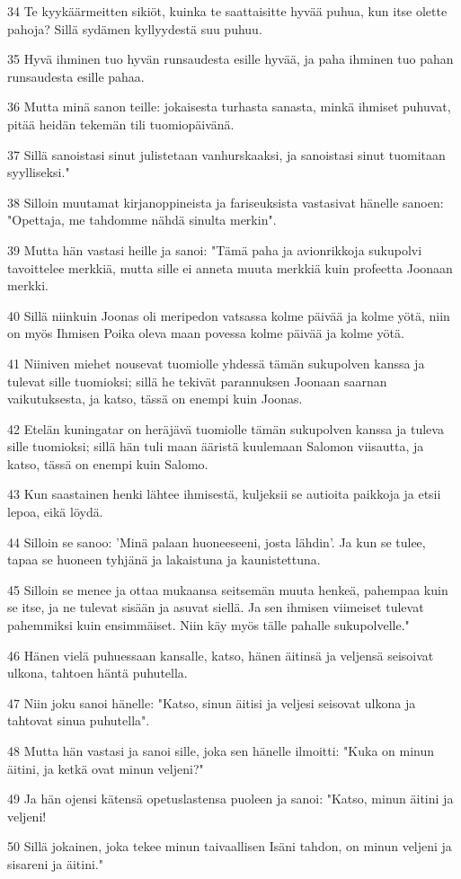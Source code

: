 \par 34 Te kyykäärmeitten sikiöt, kuinka te saattaisitte hyvää puhua, kun itse olette pahoja? Sillä sydämen kyllyydestä suu puhuu.
\par 35 Hyvä ihminen tuo hyvän runsaudesta esille hyvää, ja paha ihminen tuo pahan runsaudesta esille pahaa.
\par 36 Mutta minä sanon teille: jokaisesta turhasta sanasta, minkä ihmiset puhuvat, pitää heidän tekemän tili tuomiopäivänä.
\par 37 Sillä sanoistasi sinut julistetaan vanhurskaaksi, ja sanoistasi sinut tuomitaan syylliseksi."
\par 38 Silloin muutamat kirjanoppineista ja fariseuksista vastasivat hänelle sanoen: "Opettaja, me tahdomme nähdä sinulta merkin".
\par 39 Mutta hän vastasi heille ja sanoi: "Tämä paha ja avionrikkoja sukupolvi tavoittelee merkkiä, mutta sille ei anneta muuta merkkiä kuin profeetta Joonaan merkki.
\par 40 Sillä niinkuin Joonas oli meripedon vatsassa kolme päivää ja kolme yötä, niin on myös Ihmisen Poika oleva maan povessa kolme päivää ja kolme yötä.
\par 41 Niiniven miehet nousevat tuomiolle yhdessä tämän sukupolven kanssa ja tulevat sille tuomioksi; sillä he tekivät parannuksen Joonaan saarnan vaikutuksesta, ja katso, tässä on enempi kuin Joonas.
\par 42 Etelän kuningatar on heräjävä tuomiolle tämän sukupolven kanssa ja tuleva sille tuomioksi; sillä hän tuli maan ääristä kuulemaan Salomon viisautta, ja katso, tässä on enempi kuin Salomo.
\par 43 Kun saastainen henki lähtee ihmisestä, kuljeksii se autioita paikkoja ja etsii lepoa, eikä löydä.
\par 44 Silloin se sanoo: 'Minä palaan huoneeseeni, josta lähdin'. Ja kun se tulee, tapaa se huoneen tyhjänä ja lakaistuna ja kaunistettuna.
\par 45 Silloin se menee ja ottaa mukaansa seitsemän muuta henkeä, pahempaa kuin se itse, ja ne tulevat sisään ja asuvat siellä. Ja sen ihmisen viimeiset tulevat pahemmiksi kuin ensimmäiset. Niin käy myös tälle pahalle sukupolvelle."
\par 46 Hänen vielä puhuessaan kansalle, katso, hänen äitinsä ja veljensä seisoivat ulkona, tahtoen häntä puhutella.
\par 47 Niin joku sanoi hänelle: "Katso, sinun äitisi ja veljesi seisovat ulkona ja tahtovat sinua puhutella".
\par 48 Mutta hän vastasi ja sanoi sille, joka sen hänelle ilmoitti: "Kuka on minun äitini, ja ketkä ovat minun veljeni?"
\par 49 Ja hän ojensi kätensä opetuslastensa puoleen ja sanoi: "Katso, minun äitini ja veljeni!
\par 50 Sillä jokainen, joka tekee minun taivaallisen Isäni tahdon, on minun veljeni ja sisareni ja äitini."

